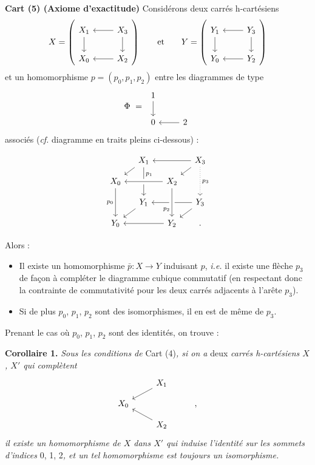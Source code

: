 \documentclass[11pt]{article}
\newcommand{\printedpage}[1]{\if\relax\detokenize{#1}\relax\else\begingroup\reversemarginpar\marginnote{\footnotesize p.~#1}\endgroup\fi}
\newcommand{\msp}[1]{\marginnote{\footnotesize [#1]}}
\begin{document}
\printedpage{4}

\textbf{Cart (5) (Axiome d'exactitude)} Considérons deux carrés h-cartésiens
\[
X = \left(\begin{tikzcd}
X_1 \ar[d] & X_3 \ar[l] \ar[d] \\
X_0 & X_2 \ar[l]
\end{tikzcd}\right)
\qquad \text{et} \qquad
Y = \left(\begin{tikzcd}
Y_1 \ar[d] & Y_3 \ar[l] \ar[d] \\
Y_0 & Y_2 \ar[l]
\end{tikzcd}\right)
\]
et un homomorphisme $p = (p_0, p_1, p_2)$ entre les diagrammes de type
\[
\Phi \ = \
\begin{tikzcd}
1 \ar[d] & \\
0 & 2 \ar[l]
\end{tikzcd}
\]
associés (\textit{cf.} diagramme en traits pleins ci-dessous) :

\msp{page 5}
\[
\begin{tikzcd}[row sep=small, column sep=small]
& X_1 \ar[dl] \ar[dd, "p_1" near start] & & X_3 \ar[ll] \ar[dl] \ar[dd, dotted, "p_3"] \\
X_0 \ar[dd, "p_0"'] & & X_2 \ar[ll, crossing over] & \\
& Y_1 \ar[dl] & & Y_3 \ar[ll] \ar[dl] \\
Y_0 & & Y_2 \ar[ll] \ar[from=uu, crossing over, "p_2"' near end] & .
\end{tikzcd}
\]

Alors :
\begin{itemize}[leftmargin=2.5em]
\item[a)] Il existe un homomorphisme $\bar{p} : X \longrightarrow Y$ induisant $p$, \textit{i.e.} il existe une flèche $p_3$ de façon à compléter le diagramme cubique commutatif (en respectant donc la contrainte de commutativité pour les deux carrés adjacents à l'arête $p_3$).
\item[b)] Si de plus $p_0$, $p_1$, $p_2$ sont des isomorphismes, il en est de même de $p_3$.
\end{itemize}

Prenant le cas où $p_0$, $p_1$, $p_2$ sont des identités, on trouve :

\textbf{Corollaire 1.} \textit{Sous les conditions de} Cart (4)\textit{, si on a} deux \textit{carrés h-cartésiens $X$, $X'$ qui complètent}
\[
\begin{tikzcd}[row sep=small]
& X_1 \ar[dl] & \\
X_0 & & , \\
& X_2 \ar[ul] &
\end{tikzcd}
\]
\textit{il existe un homomorphisme de $X$ dans $X'$ qui induise l'identité sur les sommets d'indices} 0, 1, 2\textit{, et un tel homomorphisme est toujours un isomorphisme.}
\end{document}
